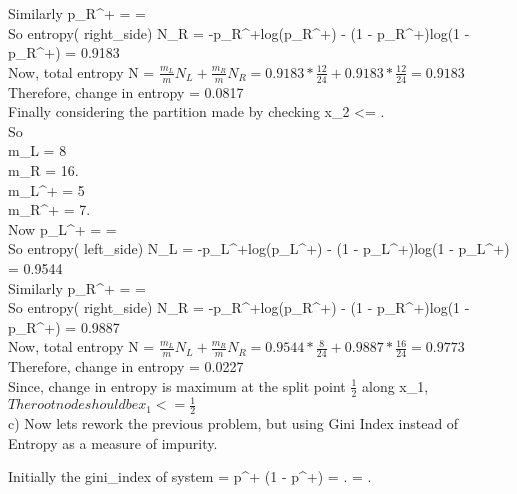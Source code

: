 \documentclass[twoside,10pt,a4paper]{article}
\theoremstyle{definition}
\theoremstyle{definition}
\theoremstyle{remark}
\renewcommand{\>}{{\rightarrow}}
\newcommand{\1}{{\mathbf 1}}
\newcommand{\0}{{\mathbf 0}}
\begin{document}
Similarly
p_R^+ =  =  \\

So
entropy( right\_side) N_R = -p_R^+log(p_R^+) - (1 - p_R^+)log(1 - p_R^+) = 0.9183\\

Now, total entropy N = $\frac{ m_L }{ m } N_L + \frac{m_R}{m} N_R = 0.9183 * \frac{12}{24} + 0.9183 * \frac{12}{24} = 0.9183$\\

Therefore, change in entropy = 0.0817\\

Finally considering the partition made by checking x_2 <= .\\

So \\
m_L = 8 \\
m_R = 16.\\
m_L^+ = 5 \\
m_R^+ = 7.\\

Now
p_L^+ =  =  \\

So
entropy( left\_side) N_L = -p_L^+log(p_L^+) - (1 - p_L^+)log(1 - p_L^+) = 0.9544\\

Similarly
p_R^+ =  =  \\

So
entropy( right\_side) N_R = -p_R^+log(p_R^+) - (1 - p_R^+)log(1 - p_R^+) = 0.9887\\

Now, total entropy N = $\frac{ m_L }{ m } N_L + \frac{m_R}{m} N_R = 0.9544 * \frac{8}{24} + 0.9887 * \frac{16}{24} = 0.9773$\\

Therefore, change in entropy = 0.0227\\

Since, change in entropy is maximum at the split point $\frac{1}{2}$ along x_1,\\
$The root node should be x_1 <= \frac{1}{2}$\\

\linebreak
c) Now lets rework the previous problem, but using Gini Index instead of Entropy as a measure of impurity.

Initially the gini\_index of system = p^+ (1 - p^+) =  .  = .\\
\end{document}
